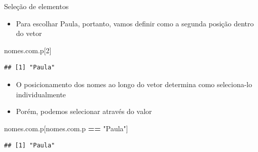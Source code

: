 \documentclass[
  10pt,
  ignorenonframetext,
]{beamer}
\newenvironment{Shaded}{\begin{snugshade}}{\end{snugshade}}
\newcommand{\DecValTok}[1]{\textcolor[rgb]{0.00,0.00,0.81}{#1}}
\newcommand{\NormalTok}[1]{#1}
\newcommand{\OperatorTok}[1]{\textcolor[rgb]{0.81,0.36,0.00}{\textbf{#1}}}
\newcommand{\StringTok}[1]{\textcolor[rgb]{0.31,0.60,0.02}{#1}}
\providecommand{\tightlist}{%
  \setlength{\itemsep}{0pt}\setlength{\parskip}{0pt}}
\begin{document}
\begin{frame}[fragile]{Seleção de elementos}
\protect\hypertarget{seleuxe7uxe3o-de-elementos-3}{}
\begin{itemize}
\tightlist
\item
  Para escolhar Paula, portanto, vamos definir como a segunda posição
  dentro do vetor
\end{itemize}

\begin{Shaded}
\begin{Highlighting}[]
\NormalTok{nomes.com.p[}\DecValTok{2}\NormalTok{]}
\end{Highlighting}
\end{Shaded}

\begin{verbatim}
## [1] "Paula"
\end{verbatim}

\begin{itemize}
\tightlist
\item
  O posicionamento dos nomes ao longo do vetor determina como
  seleciona-lo individualmente
\item
  Porém, podemos selecionar através do valor
\end{itemize}

\begin{Shaded}
\begin{Highlighting}[]
\NormalTok{nomes.com.p[nomes.com.p }\OperatorTok{==}\StringTok{ "Paula"}\NormalTok{]}
\end{Highlighting}
\end{Shaded}

\begin{verbatim}
## [1] "Paula"
\end{verbatim}
\end{frame}
\end{document}
